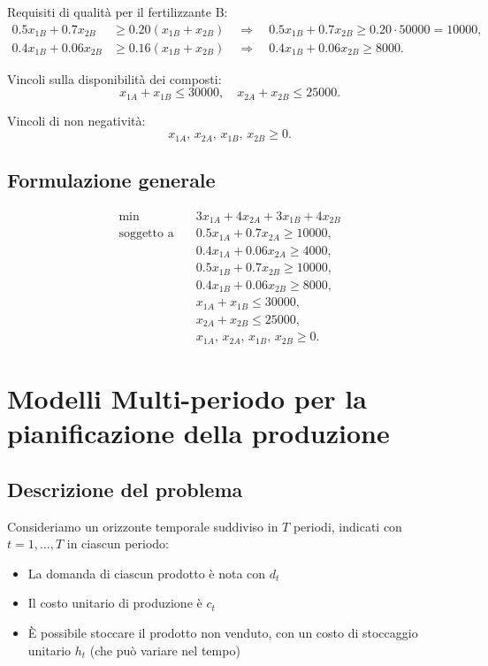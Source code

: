 Requisiti di qualità per il fertilizzante B:
\[ 
\begin{aligned}
0.5x_{1B}+0.7x_{2B} &\geq 0.20(x_{1B}+x_{2B})\quad\Rightarrow\quad 0.5x_{1B}+0.7x_{2B}\geq 0.20\cdot50000=10000, \\
0.4x_{1B}+0.06x_{2B} &\geq 0.16(x_{1B}+x_{2B})\quad\Rightarrow\quad 0.4x_{1B}+0.06x_{2B}\geq 8000.
\end{aligned}
\]

Vincoli sulla disponibilità dei composti:
\[ 
x_{1A}+x_{1B}\leq 30000,\quad x_{2A}+x_{2B}\leq 25000.
\]

Vincoli di non negatività:
\[ 
x_{1A},\, x_{2A},\, x_{1B},\, x_{2B}\geq 0.
\]

\subsection{Formulazione generale}
\[ 
\begin{aligned}
\min \quad & 3x_{1A}+4x_{2A}+3x_{1B}+4x_{2B} \\
\text{soggetto a}\quad 
& 0.5x_{1A}+0.7x_{2A}\geq 10000, \\
& 0.4x_{1A}+0.06x_{2A}\geq 4000, \\
& 0.5x_{1B}+0.7x_{2B}\geq 10000, \\
& 0.4x_{1B}+0.06x_{2B}\geq 8000, \\
& x_{1A}+x_{1B}\leq 30000, \\
& x_{2A}+x_{2B}\leq 25000, \\
& x_{1A},\, x_{2A},\, x_{1B},\, x_{2B}\geq 0.
\end{aligned}
\]

\section{Modelli Multi-periodo per la pianificazione della produzione}
\subsection{Descrizione del problema}

Consideriamo un orizzonte temporale suddiviso in $T$ periodi, indicati con $t=1,\ldots,T$ in ciascun periodo:
\begin{itemize}
    \item La domanda di ciascun prodotto è nota con $d_t$
    \item Il costo unitario di produzione è $c_t$
    \item È possibile stoccare il prodotto non venduto, con un costo di stoccaggio unitario $h_t$ (che può variare nel tempo)
\end{itemize}

